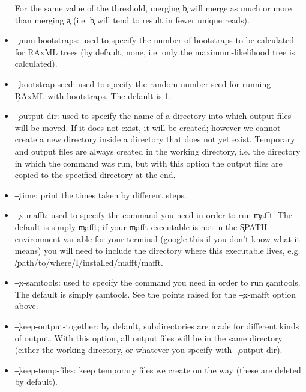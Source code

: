\begin{itemize}
For the same value of the threshold, merging \c{b} will merge as much or more than merging \c{a} (i.e. \c{b} will tend to result in fewer unique reads).
\item \c{--num-bootstraps}: used to specify the number of bootstraps to be calculated for \c{RAxML} trees (by default, none, i.e. only the maximum-likelihood tree is calculated).
\item \c{--bootstrap-seed}: used to specify the random-number seed for running \c{RAxML} with bootstraps.
The default is 1.
\item \c{--output-dir}: used to specify the name of a directory into which output files will be moved.
If it does not exist, it will be created; however we cannot create a new directory inside a directory that does not yet exist.
Temporary and output files are always created in the working directory, i.e. the directory in which the \pmt command was run, but with this option the output files are copied to the specified directory at the end.
\item \c{--time}: print the times taken by different steps.
\item \c{--x-mafft}: used to specify the command you need in order to run \c{mafft}.
The default is simply \c{mafft}; if your \c{mafft} executable is not in the \c{\$PATH} environment variable for your terminal (google this if you don't know what it means) you will need to include the directory where this executable lives, e.g. \c{/path/to/where/I/installed/mafft/mafft}.
\item \c{--x-samtools}: used to specify the command you need in order to run \c{samtools}.
The default is simply \c{samtools}.
See the points raised for the \c{--x-mafft} option above.
\item \c{--keep-output-together}: by default, subdirectories are made for different kinds of output.
With this option, all output files will be in the same directory (either the working directory, or whatever you specify with \c{--output-dir}).
\item \c{--keep-temp-files}: keep temporary files we create on the way (these are deleted by default).
\end{itemize}

